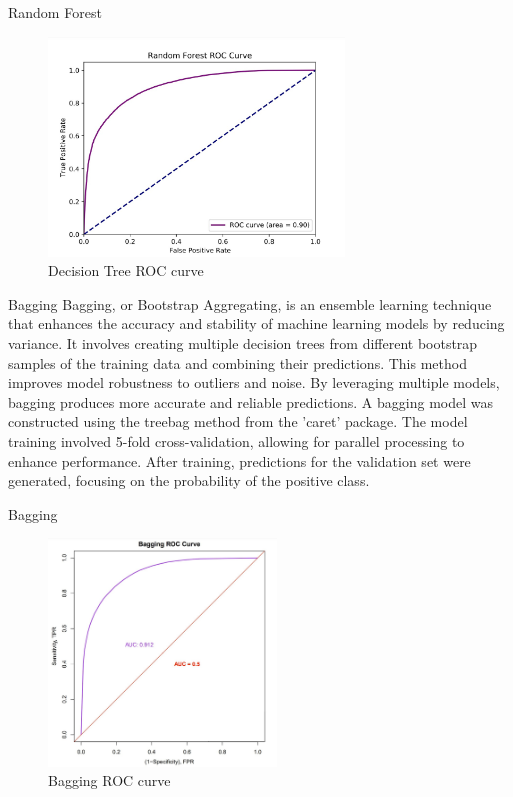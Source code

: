 \documentclass[10pt]{beamer}
\begin{document}
\begin{frame}[t]{Random Forest}\justifying \vspace{1pt}
	\begin{figure}[htp]
		\centering
		\includegraphics[width=0.7\textwidth]{./Random_forest_ROC.jpg}
		\caption{Decision Tree ROC curve}
		\label{fig:picture1}
	\end{figure}
\end{frame}
 
 
\begin{frame}[t]{Bagging}\justifying \vspace{10pt}
	Bagging, or Bootstrap Aggregating, is an ensemble learning technique that enhances the accuracy and stability of machine learning models by reducing variance. It involves creating multiple decision trees from different bootstrap samples of the training data and combining their predictions. This method improves model robustness to outliers and noise. By leveraging multiple models, bagging produces more accurate and reliable predictions.
	\vskip 8pt
	A bagging model was constructed using the treebag method from the 'caret' package. The model training involved 5-fold cross-validation, allowing for parallel processing to enhance performance. After training, predictions for the validation set were generated, focusing on the probability of the positive class. 
\end{frame}


\begin{frame}[t]{Bagging}\justifying \vspace{1pt}
	\begin{figure}[htp]
		\centering
		\includegraphics[width=0.54\textwidth]{./Bagging_ROC.jpg}
		\caption{Bagging ROC curve}
		\label{fig:picture1}
	\end{figure}
\end{frame}
\end{document}
